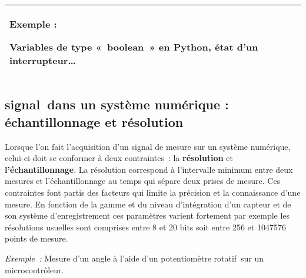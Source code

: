 \documentclass[
]{article}
\begin{document}
\begin{longtable}[]{@{}
  >{\raggedright\arraybackslash}p{}@{}}
\toprule
\endhead
\textbf{Exemple :}

Variables de type «~boolean~» en Python, état d'un
interrupteur\ldots{} \\
\bottomrule
\end{longtable}

\hypertarget{signal-dans-un-systuxe8me-numuxe9rique-uxe9chantillonnage-et-ruxe9solution}{%
\subsection{signal~dans un système numérique : échantillonnage et
résolution}\label{signal-dans-un-systuxe8me-numuxe9rique-uxe9chantillonnage-et-ruxe9solution}}

Lorsque l'on fait l'acquisition d'un signal de mesure sur un système
numérique, celui-ci doit se conformer à deux contraintes~: la
\textbf{résolution} et \textbf{l'échantillonnage}. La résolution
correspond à l'intervalle minimum entre deux mesures et
l'échantillonnage au temps qui sépare deux prises de mesure. Ces
contraintes font partis des facteurs qui limite la précision et la
connaissance d'une mesure. En fonction de la gamme et du niveau
d'intégration d'un capteur et de son système d'enregistrement ces
paramètres varient fortement par exemple les résolutions usuelles sont
comprises entre 8 et 20 bits soit entre 256 et 1047576 points de mesure.

\emph{Exemple~:} Mesure d'un angle à l'aide d'un potentiomètre
rotatif~sur un microcontrôleur.
\end{document}
